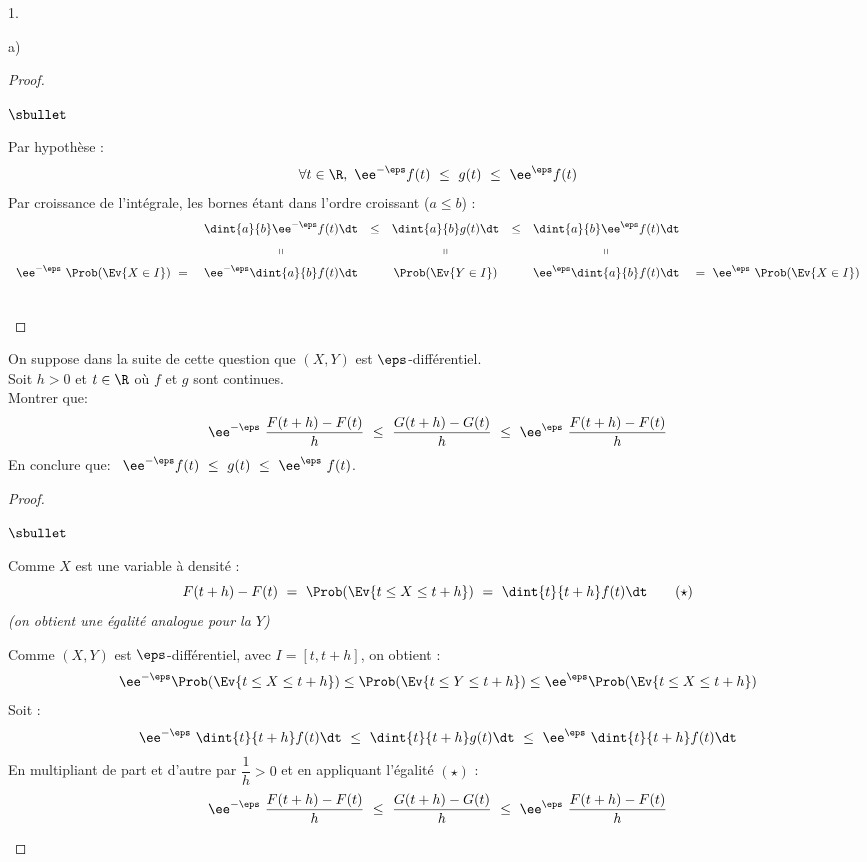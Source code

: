 \begin{noliste}{1.}
\begin{noliste}{a)}
\begin{proof}
\begin{noliste}{$\sbullet$}
      \item Par hypothèse : 
        \[
        \forall t \in \R, \ \ee^{-\eps} f(t) \ \leq \ g(t) \ \leq \
        \ee^{\eps}f(t)
        \]
        Par croissance de l'intégrale, les bornes étant dans l'ordre
        croissant ($a \leq b$) :
        \[
        \begin{array}{rcccccl}
          & \dint{a}{b} \ee^{-\eps} f(t) \dt & \leq & \dint{a}{b} g(t) 
\dt
          & \leq & \dint{a}{b} \ee^{\eps} f(t) \dt &
          \\[.2cm]
          & \shortparallel & & \shortparallel & & \shortparallel
          \\[.2cm]
          \ee^{-\eps} \ \Prob(\Ev{X \in I}) \ = \ & \ee^{-\eps}
          \dint{a}{b}f(t) \dt & &  \Prob(\Ev{Y \in I}) & & \ee^{\eps}
          \dint{a}{b}f(t) \dt & \ = \ \ee^{\eps} \ \Prob(\Ev{X \in I})
        \end{array}
        \]        
      \end{noliste}
      ~\\[-1.2cm]
    \end{proof}

  \item On suppose dans la suite de cette question que $(X,Y)$ est
    $\eps$-différentiel.\\
    Soit $h>0$ et $t \in \R$ où $f$ et $g$ sont continues.\\[.2cm]
    Montrer que:
    \[
    \ee^{-\eps} \ \dfrac{F(t+h)-F(t)}{h} \ \leq \
    \dfrac{G(t+h)-G(t)}{h} \ \leq \ \ee^{\eps} \
    \dfrac{F(t+h)-F(t)}{h}
    \]
    En conclure que: \ $\ee^{-\eps} f(t) \ \leq \ g(t) \ \leq \
    \ee^{\eps} \ f(t)$.

    \begin{proof}~%
      \begin{noliste}{$\sbullet$}
      \item Comme $X$ est une variable à densité : 
        \[
        F(t+h)-F(t) \ = \ \Prob(\Ev{ t \leq X \leq t+h}) \ = \
        \dint{t}{t+h} f(t) \dt \qquad (\star)
        \]
        {\it (on obtient une égalité analogue pour la \var $Y$)}

      \item Comme $(X,Y)$ est $\eps$-différentiel, avec $I =
        [t, t+h]$, on obtient :
        \[
          \ee^{-\eps} \Prob(\Ev{t \leq X \leq t+h}) \leq 
          \Prob(\Ev{t \leq Y \leq t+h}) \leq \ee^{\eps} 
          \Prob(\Ev{t \leq X \leq t+h})
        \]
        Soit :
        \[
        \ee^{-\eps} \ \dint{t}{t+h} f(t) \dt \ \leq \ \dint{t}{t+h} g(t)
        \dt \ \leq \ \ee^{\eps} \ \dint{t}{t+h} f(t) \dt
        \]
        En multipliant de part et d'autre par $\dfrac{1}{h} > 0$ et en
        appliquant l'égalité $(\star)$ : 
        \[
        \ee^{-\eps} \ \dfrac{F(t+h) - F(t)}{h} \ \leq \ \dfrac{G(t+h)
          - G(t)}{h} \ \leq \ \ee^{\eps} \ \dfrac{F(t+h) - F(t)}{h}
        \]


\end{noliste}
\end{proof}
\end{noliste}
\end{noliste}
